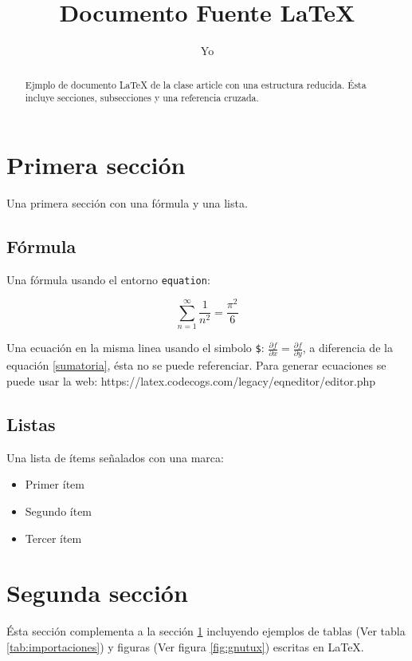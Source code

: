 \documentclass[a4,11pt]{article}
\title{Documento Fuente \LaTeX{}}
\author{Yo}
\begin{document}
\maketitle
\tableofcontents

\begin{abstract}
  Ejmplo de documento \LaTeX{} de la clase {\ttfamily article} con una estructura reducida. Ésta incluye secciones, subsecciones y una referencia cruzada.
\end{abstract}

\section{Primera sección} \label{primera}
Una primera sección con una fórmula y una lista.

\subsection{Fórmula}
Una fórmula usando el entorno \texttt{equation}:

\begin{equation}
  \sum_{n=1}^{\infty}       \frac{1}{n^{2}} = \frac{\pi^{2} }{6}
  \label{sumatoria}
\end{equation}

Una ecuación en la misma linea usando el simbolo \texttt{\$}: $\frac{\partial f}{\partial x} =\frac{\partial f}{\partial y}$, a diferencia de la equación \ref{sumatoria}, ésta no se puede referenciar.
Para generar ecuaciones se puede usar la web: https://latex.codecogs.com/legacy/eqneditor/editor.php
\subsection{Listas}
Una lista de ítems señalados con una marca:

\begin{itemize}
\item Primer ítem
\item Segundo ítem
\item Tercer ítem
\end{itemize}

\section{Segunda sección}

Ésta sección complementa a la sección \ref{primera} incluyendo ejemplos de tablas (Ver tabla \ref{tab:importaciones}) y figuras (Ver figura \ref{fig:gnutux}) escritas en \LaTeX.
\end{document}
